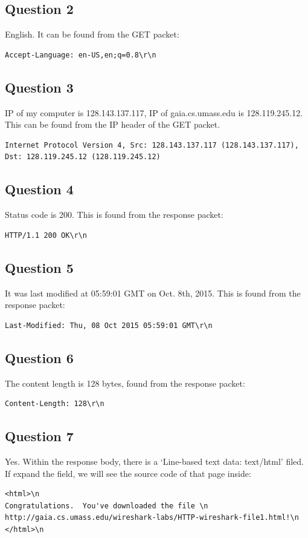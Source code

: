 \documentclass[titlepage, paper=a4, fontsize=11pt]{scrartcl} %
\numberwithin{equation}{section} %
\numberwithin{figure}{section} %
\numberwithin{table}{section} %
\begin{document}
\subsection*{Question 2}
English. It can be found from the GET packet:
\begin{verbatim}
Accept-Language: en-US,en;q=0.8\r\n
\end{verbatim}


\subsection*{Question 3}
IP of my computer is 128.143.137.117, IP of gaia.cs.umass.edu is 128.119.245.12.
This can be found from the IP header of the GET packet.
\begin{verbatim}
Internet Protocol Version 4, Src: 128.143.137.117 (128.143.137.117),
Dst: 128.119.245.12 (128.119.245.12)
\end{verbatim}


\subsection*{Question 4}
Status code is 200. This is found from the response packet:
\begin{verbatim}
HTTP/1.1 200 OK\r\n
\end{verbatim}


\subsection*{Question 5}
It was last modified at 05:59:01 GMT on Oct. 8th, 2015. This is found from the response packet:
\begin{verbatim}
Last-Modified: Thu, 08 Oct 2015 05:59:01 GMT\r\n
\end{verbatim}


\subsection*{Question 6}
The content length is 128 bytes, found from the response packet:
\begin{verbatim}
Content-Length: 128\r\n
\end{verbatim}


\subsection*{Question 7}
Yes. Within the response body, there is a `Line-based text data: text/html' filed.
If expand the field, we will see the source code of that page inside:
\begin{verbatim}
<html>\n
Congratulations.  You've downloaded the file \n
http://gaia.cs.umass.edu/wireshark-labs/HTTP-wireshark-file1.html!\n
</html>\n
\end{verbatim}
\end{document}
